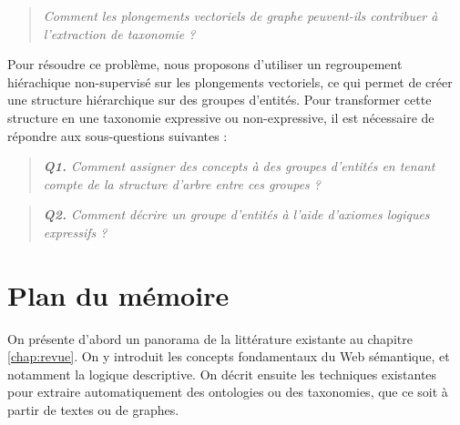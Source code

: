 \begin{quote}
    \emph{Comment les plongements vectoriels de graphe peuvent-ils contribuer à l'extraction de taxonomie ?}
\end{quote}




Pour résoudre ce problème, nous proposons d'utiliser un regroupement hiérachique non-supervisé sur les plongements vectoriels, ce qui permet de créer une structure hiérarchique sur des groupes d'entités. Pour transformer cette structure en une taxonomie expressive ou non-expressive, il est nécessaire de répondre aux sous-questions suivantes :
%
\begin{quote}
    \emph{\textbf{Q1.} Comment assigner des concepts à des groupes d'entités en tenant compte de la structure d'arbre entre ces groupes ?}
\end{quote}

\begin{quote}
    \emph{\textbf{Q2.} Comment décrire un groupe d'entités à l'aide d'axiomes logiques expressifs ?}
\end{quote}







\section{Plan du mémoire}  %



On présente d'abord un panorama de la littérature existante au chapitre \ref{chap:revue}. On y introduit les concepts fondamentaux du Web sémantique, et notamment la logique descriptive. On décrit ensuite les techniques existantes pour extraire automatiquement des ontologies ou des taxonomies, que ce soit à partir de textes ou de graphes.


